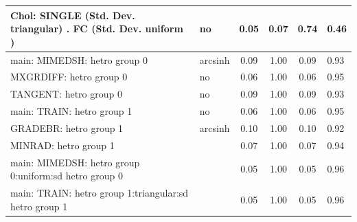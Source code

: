 \begin{table}
\begin{center}
\begin{tabular}{|l|l|c|c|c|l|}
			\hline
			 Chol: SINGLE (Std. Dev. triangular) . FC (Std. Dev.   uniform ) & no & 0.05 & 0.07 & 0.74 & 0.46 \\
			\hline
			main: MIMEDSH: hetro group 0 & arcsinh & 0.09 & 1.00 & 0.09 & 0.93 \\
			\hline
			MXGRDIFF: hetro group 0 & no & 0.06 & 1.00 & 0.06 & 0.95 \\
			\hline
			TANGENT: hetro group 0 & no & 0.09 & 1.00 & 0.09 & 0.93 \\
			\hline
			main: TRAIN: hetro group 1 & no & 0.06 & 1.00 & 0.06 & 0.95 \\
			\hline
			GRADEBR: hetro group 1 & arcsinh & 0.10 & 1.00 & 0.10 & 0.92 \\
			\hline
			MINRAD: hetro group 1 &  & 0.07 & 1.00 & 0.07 & 0.94 \\
			\hline
			main: MIMEDSH: hetro group 0:uniform:sd  hetro group 0 &  & 0.05 & 1.00 & 0.05 & 0.96 \\
			\hline
			main: TRAIN: hetro group 1:triangular:sd  hetro group 1 &  & 0.05 & 1.00 & 0.05 & 0.96 \\
			\hline
		\end{tabular}
	\end{center}
\end{table}